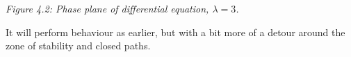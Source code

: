 \documentclass[11pt]{article}
\begin{document}
\begin{solution}
\begin{center}
        \end{center}
        \begin{center}
            \textit{Figure 4.2: Phase plane of differential equation, $\lambda = 3$.}
        \end{center}
        It will perform behaviour as earlier, but with a bit more of a detour around the zone of stability and closed paths.
    \end{solution}
\end{document}

